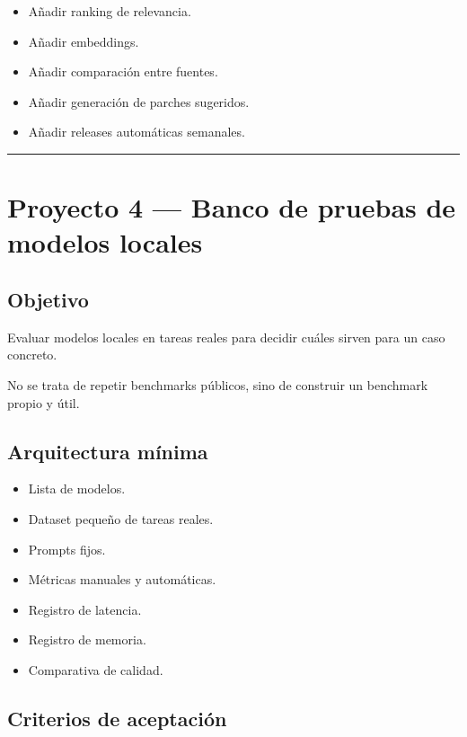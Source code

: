 \begin{itemize}
\tightlist
\item
  Añadir ranking de relevancia.
\item
  Añadir embeddings.
\item
  Añadir comparación entre fuentes.
\item
  Añadir generación de parches sugeridos.
\item
  Añadir releases automáticas semanales.
\end{itemize}

\begin{center}\rule{0.5\linewidth}{0.5pt}\end{center}

\section{Proyecto 4 --- Banco de pruebas de modelos
locales}\label{proyecto-4-banco-de-pruebas-de-modelos-locales}

\subsection{Objetivo}\label{objetivo-6}

Evaluar modelos locales en tareas reales para decidir cuáles sirven para
un caso concreto.

No se trata de repetir benchmarks públicos, sino de construir un
benchmark propio y útil.

\subsection{Arquitectura mínima}\label{arquitectura-muxednima-4}

\begin{itemize}
\tightlist
\item
  Lista de modelos.
\item
  Dataset pequeño de tareas reales.
\item
  Prompts fijos.
\item
  Métricas manuales y automáticas.
\item
  Registro de latencia.
\item
  Registro de memoria.
\item
  Comparativa de calidad.
\end{itemize}

\subsection{Criterios de aceptación}\label{criterios-de-aceptaciuxf3n-3}

